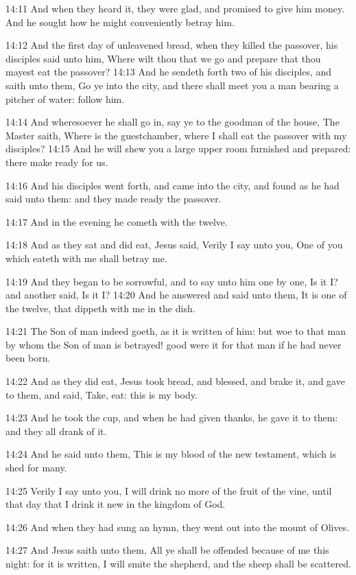 14:11 And when they heard it, they were glad, and promised to give him money. And he sought how he might conveniently betray him.

14:12 And the first day of unleavened bread, when they killed the passover, his disciples said unto him, Where wilt thou that we go and prepare that thou mayest eat the passover?  14:13 And he sendeth forth two of his disciples, and saith unto them, Go ye into the city, and there shall meet you a man bearing a pitcher of water: follow him.

14:14 And wheresoever he shall go in, say ye to the goodman of the house, The Master saith, Where is the guestchamber, where I shall eat the passover with my disciples?  14:15 And he will shew you a large upper room furnished and prepared: there make ready for us.

14:16 And his disciples went forth, and came into the city, and found as he had said unto them: and they made ready the passover.

14:17 And in the evening he cometh with the twelve.

14:18 And as they sat and did eat, Jesus said, Verily I say unto you, One of you which eateth with me shall betray me.

14:19 And they began to be sorrowful, and to say unto him one by one, Is it I? and another said, Is it I?  14:20 And he answered and said unto them, It is one of the twelve, that dippeth with me in the dish.

14:21 The Son of man indeed goeth, as it is written of him: but woe to that man by whom the Son of man is betrayed! good were it for that man if he had never been born.

14:22 And as they did eat, Jesus took bread, and blessed, and brake it, and gave to them, and said, Take, eat: this is my body.

14:23 And he took the cup, and when he had given thanks, he gave it to them: and they all drank of it.

14:24 And he said unto them, This is my blood of the new testament, which is shed for many.

14:25 Verily I say unto you, I will drink no more of the fruit of the vine, until that day that I drink it new in the kingdom of God.

14:26 And when they had sung an hymn, they went out into the mount of Olives.

14:27 And Jesus saith unto them, All ye shall be offended because of me this night: for it is written, I will smite the shepherd, and the sheep shall be scattered.

